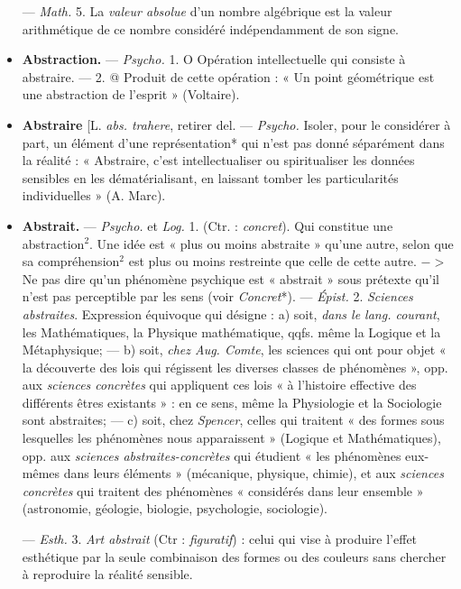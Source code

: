 \begin{itemize}[leftmargin=1cm, label=, itemsep=1pt]
 — \textsf{\textit {Math.}} 5. La {\it valeur absolue} d’un
nombre algébrique est la valeur
arithmétique de ce nombre considéré
indépendamment de son signe.

\item {\bf Abstraction.} — \textsf{\textit {Psycho.}} 1. O Opération
intellectuelle qui consiste à
abstraire. — 2. @ Produit de cette
opération : « Un point géométrique est
une abstraction de l'esprit » (Voltaire).

\item {\bf Abstraire} [L. {\it abs. trahere}, retirer del.
— \textsf{\textit {Psycho.}} Isoler, pour le considérer
à part, un élément d'une représentation*
qui n'est pas donné séparément
dans la réalité : « Abstraire,
c’est intellectualiser ou spiritualiser
les données sensibles en les dématérialisant,
en laissant tomber les
particularités individuelles » (A.
Marc).

\item {\bf Abstrait.} — \textsf{\textit {Psycho.}} et \textsf{\textit {Log.}} 1. (Ctr. :
{\it concret}). Qui constitue une abstraction$^2$.
Une idée est « plus ou moins
abstraite » qu'une autre, selon que
sa compréhension$^2$ est plus ou
moins restreinte que celle de cette
autre. $->$ Ne pas dire qu’un phénomène
psychique est « abstrait »
sous prétexte qu'il n’est pas perceptible
par les sens (voir {\it Concret}*). —
\textsf{\textit {Épist.}} 2. {\it Sciences abstraites}. Expression
équivoque qui désigne : a) soit,
{\it dans le lang. courant}, les Mathématiques,
la Physique mathématique,
qqfs. même la Logique et la Métaphysique;
— b) soit, {\it chez Aug.
Comte}, les sciences qui ont pour
objet « la découverte des lois qui
régissent les diverses classes de phénomènes »,
opp. aux {\it sciences concrètes}
qui appliquent ces lois « à l’histoire
effective des différents êtres existants » :
en ce sens, même la Physiologie
et la Sociologie sont abstraites;
— c) soit, chez {\it Spencer}, celles qui
traitent « des formes sous lesquelles
les phénomènes nous apparaissent »
(Logique et Mathématiques), opp.
aux {\it sciences abstraites-concrètes} qui
étudient « les phénomènes eux-mêmes
dans leurs éléments » (mécanique,
physique, chimie), et aux
{\it sciences concrètes} qui traitent des
phénomènes « considérés dans leur
ensemble » (astronomie, géologie,
biologie, psychologie, sociologie).

— \textsf{\textit {Esth.}} 3. {\it Art abstrait} (Ctr : {\it figuratif}) : celui qui vise à produire
l'effet esthétique par la seule combinaison des formes ou des couleurs
sans chercher à reproduire la réalité
sensible.


\end{itemize}
